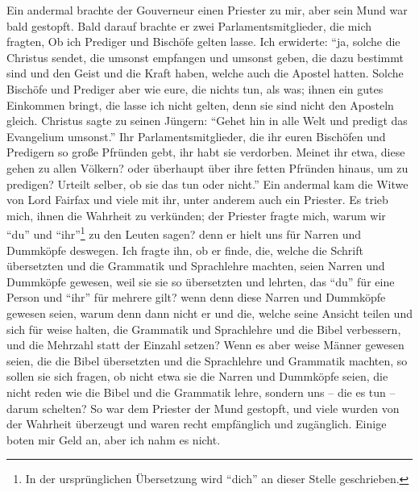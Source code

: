 Ein andermal brachte der Gouverneur einen Priester zu
mir, aber sein Mund war bald gestopft. Bald darauf brachte
er zwei Parlamentsmitglieder, die mich fragten, Ob ich Prediger
und Bischöfe gelten lasse. Ich erwiderte: "`ja, solche die Christus
sendet, die umsonst empfangen und umsonst geben, die dazu bestimmt 
sind und den Geist und die Kraft haben, welche auch die
Apostel hatten. Solche Bischöfe und Prediger aber wie eure, die
nichts tun, als was; ihnen ein gutes Einkommen bringt, die
lasse ich nicht gelten, denn sie sind nicht den Aposteln gleich.
Christus sagte zu seinen Jüngern: "`Gehet hin in alle Welt und
predigt das Evangelium umsonst."' Ihr Parlamentsmitglieder,
die ihr euren Bischöfen und Predigern so große Pfründen gebt,
ihr habt sie verdorben. Meinet ihr etwa, diese gehen zu allen
Völkern? oder überhaupt über ihre fetten Pfründen hinaus, um
zu predigen? Urteilt selber, ob sie das tun oder nicht."'
Ein andermal kam die Witwe von Lord Fairfax und viele
mit ihr, unter anderem auch ein Priester. Es trieb mich, ihnen
die Wahrheit zu verkünden; der Priester fragte mich, warum wir
"`du"' und "`ihr"'\footnote{In der ursprünglichen Übersetzung 
wird "`dich"' an dieser Stelle geschrieben.} zu den Leuten sagen? 
denn er hielt uns für
Narren und Dummköpfe deswegen. Ich fragte ihn, ob er finde,
die, welche die Schrift übersetzten und die Grammatik und 
Sprachlehre machten, seien Narren und Dummköpfe gewesen, weil sie
sie so übersetzten und lehrten, das "`du"' für eine Person und
"`ihr"' für mehrere gilt? wenn denn diese Narren und Dummköpfe
gewesen seien, warum denn dann nicht er und die, welche seine
Ansicht teilen und sich für weise halten, die Grammatik und 
Sprachlehre und die Bibel verbessern, und die Mehrzahl statt der 
Einzahl setzen? Wenn es aber weise Männer gewesen seien, die die
Bibel übersetzten und die Sprachlehre und Grammatik machten,
so sollen sie sich fragen, ob nicht etwa sie die Narren und 
Dummköpfe seien, die nicht reden wie die Bibel und die Grammatik
lehre, sondern uns -- die es tun -- darum schelten? So war dem
Priester der Mund gestopft, und viele wurden 
von der Wahrheit überzeugt und waren recht empfänglich und zugänglich. 
Einige boten mir Geld an, aber ich nahm es nicht.

